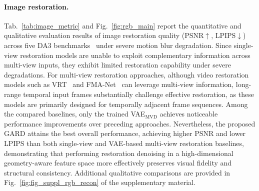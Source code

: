 \documentclass{llmxive}
\begin{document}
\paragraph{Image restoration.}
Tab.~\ref{tab:image_metric} and Fig.~\ref{fig:rgb_main} report the quantitative and qualitative evaluation results of image restoration quality (PSNR$\uparrow$, LPIPS$\downarrow$) across five DA3 benchmarks~\cite{depthanything3} under severe motion blur degradation. Since single-view restoration models are unable to exploit complementary information across multi-view inputs, they exhibit limited restoration capability under severe degradations. For multi-view restoration approaches, although video restoration models such as VRT~\cite{liang2024vrt} and FMA-Net~\cite{Youk_2024_CVPR} can leverage multi-view information, long-range temporal input frames substantially challenge effective restoration, as these models are primarily designed for temporally adjacent frame sequences. Among the compared baselines, only the trained VAE$_\text{MVD}$ achieves noticeable performance improvements over preceding approaches. Nevertheless, the proposed GARD attains the best overall performance, achieving higher PSNR and lower LPIPS than both single-view and VAE-based multi-view restoration baselines, demonstrating that performing restoration denoising in a high-dimensional geometry-aware feature space more effectively preserves visual fidelity and structural consistency. Additional qualitative comparisons are provided in Fig.~\ref{fig:fig_suppl_rgb_recon} of the supplementary material.
\end{document}
